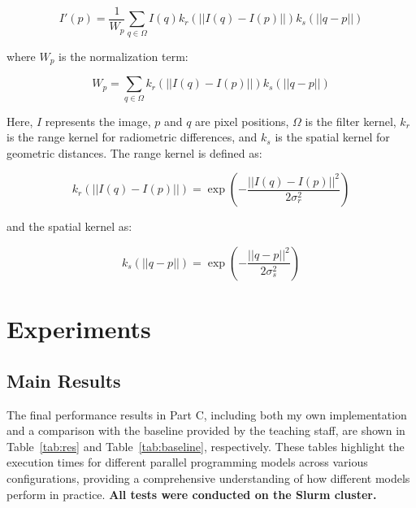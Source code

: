 \documentclass[12pt,a4paper]{report}
\begin{document}
    \begin{equation}
    I'(p) = \frac{1}{W_p} \sum_{q \in \Omega} I(q) k_r(||I(q)-I(p)||) k_s(||q-p||)
    \label{eq:bilateral_output}
    \end{equation}
    
    where \(W_p\) is the normalization term:
    
    \begin{equation}
    W_p = \sum_{q \in \Omega} k_r(||I(q)-I(p)||) k_s(||q-p||)
    \label{eq:normalization}
    \end{equation}
    
    Here, \(I\) represents the image, \(p\) and \(q\) are pixel positions, \(\Omega\) is the filter kernel, \(k_r\) is the range kernel for radiometric differences, and \(k_s\) is the spatial kernel for geometric distances. The range kernel is defined as:
    
    \begin{equation}
    k_r(||I(q)-I(p)||) = \exp \left( -\frac{||I(q)-I(p)||^2}{2\sigma_r^2} \right)
    \label{eq:range_kernel}
    \end{equation}
    
    and the spatial kernel as:
    
    \begin{equation}
    k_s(||q-p||) = \exp \left( -\frac{||q-p||^2}{2\sigma_s^2} \right)
    \label{eq:spatial_kernel}
    \end{equation}

    

\section{Experiments}

\subsection{Main Results}

The final performance results in Part C, including both my own implementation and a comparison with the baseline provided by the teaching staff, are shown in Table~\ref{tab:res} and Table~\ref{tab:baseline}, respectively. These tables highlight the execution times for different parallel programming models across various configurations, providing a comprehensive understanding of how different models perform in practice. \textbf{All tests were conducted on the Slurm cluster.}
\end{document}
